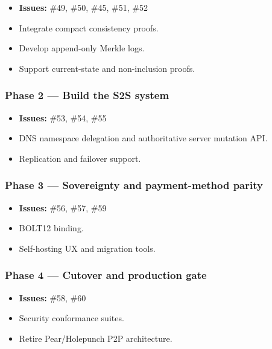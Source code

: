 \documentclass[
]{article}
\providecommand{\tightlist}{%
  \setlength{\itemsep}{0pt}\setlength{\parskip}{0pt}}
\begin{document}
\begin{itemize}
\tightlist
\item
  \textbf{Issues:} \#49, \#50, \#45, \#51, \#52
\item
  Integrate compact consistency proofs.
\item
  Develop append-only Merkle logs.
\item
  Support current-state and non-inclusion proofs.
\end{itemize}

\hypertarget{phase-2-build-the-s2s-system}{%
\subsubsection{Phase 2 --- Build the S2S
system}\label{phase-2-build-the-s2s-system}}

\begin{itemize}
\tightlist
\item
  \textbf{Issues:} \#53, \#54, \#55
\item
  DNS namespace delegation and authoritative server mutation API.
\item
  Replication and failover support.
\end{itemize}

\hypertarget{phase-3-sovereignty-and-payment-method-parity}{%
\subsubsection{Phase 3 --- Sovereignty and payment-method
parity}\label{phase-3-sovereignty-and-payment-method-parity}}

\begin{itemize}
\tightlist
\item
  \textbf{Issues:} \#56, \#57, \#59
\item
  BOLT12 binding.
\item
  Self-hosting UX and migration tools.
\end{itemize}

\hypertarget{phase-4-cutover-and-production-gate}{%
\subsubsection{Phase 4 --- Cutover and production
gate}\label{phase-4-cutover-and-production-gate}}

\begin{itemize}
\tightlist
\item
  \textbf{Issues:} \#58, \#60
\item
  Security conformance suites.
\item
  Retire Pear/Holepunch P2P architecture.
\end{itemize}
\end{document}
